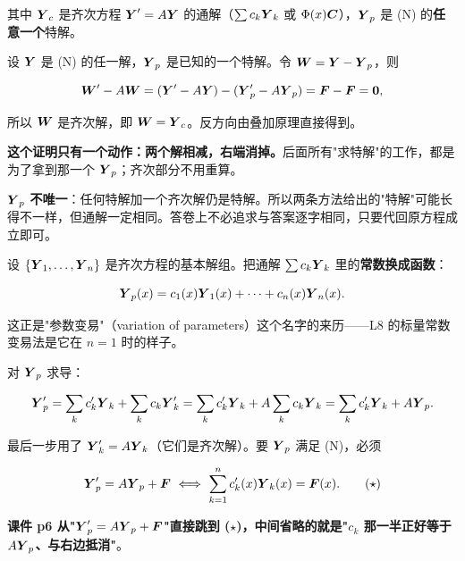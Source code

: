 \documentclass[11pt]{ctexart}
\begin{document}
其中 $\boldsymbol{Y}_c$ 是齐次方程 $\boldsymbol{Y}'=A\boldsymbol{Y}$ 的通解（$\sum c_k\boldsymbol{Y}_k$ 或 $\Phi(x)\boldsymbol{C}$），$\boldsymbol{Y}_p$ 是 (N) 的\textbf{任意一个}特解。


设 $\boldsymbol{Y}$ 是 (N) 的任一解，$\boldsymbol{Y}_p$ 是已知的一个特解。令 $\boldsymbol{W}=\boldsymbol{Y}-\boldsymbol{Y}_p$，则

\[
\boldsymbol{W}'-A\boldsymbol{W}=(\boldsymbol{Y}'-A\boldsymbol{Y})-(\boldsymbol{Y}_p'-A\boldsymbol{Y}_p)=\boldsymbol{F}-\boldsymbol{F}=\boldsymbol{0},
\]

所以 $\boldsymbol{W}$ 是齐次解，即 $\boldsymbol{W}=\boldsymbol{Y}_c$。反方向由叠加原理直接得到。

\textbf{这个证明只有一个动作：两个解相减，右端消掉。}后面所有"求特解"的工作，都是为了拿到那一个 $\boldsymbol{Y}_p$；齐次部分不用重算。


$\boldsymbol{Y}_p$ \textbf{不唯一}：任何特解加一个齐次解仍是特解。所以两条方法给出的"特解"可能长得不一样，但通解一定相同。答卷上不必追求与答案逐字相同，只要代回原方程成立即可。



设 $\{\boldsymbol{Y}_1,\dots,\boldsymbol{Y}_n\}$ 是齐次方程的基本解组。把通解 $\sum c_k\boldsymbol{Y}_k$ 里的\textbf{常数换成函数}：

\[
\boldsymbol{Y}_p(x)=c_1(x)\boldsymbol{Y}_1(x)+\cdots+c_n(x)\boldsymbol{Y}_n(x).
\]

这正是"参数变易"（variation of parameters）这个名字的来历——L8 的标量常数变易法是它在 $n=1$ 时的样子。


对 $\boldsymbol{Y}_p$ 求导：

\[
\boldsymbol{Y}_p'=\sum_k c_k'\boldsymbol{Y}_k+\sum_k c_k\boldsymbol{Y}_k'
=\sum_k c_k'\boldsymbol{Y}_k+A\sum_k c_k\boldsymbol{Y}_k
=\sum_k c_k'\boldsymbol{Y}_k+A\boldsymbol{Y}_p .
\]

最后一步用了 $\boldsymbol{Y}_k'=A\boldsymbol{Y}_k$（它们是齐次解）。要 $\boldsymbol{Y}_p$ 满足 (N)，必须

\[
\boldsymbol{Y}_p'=A\boldsymbol{Y}_p+\boldsymbol{F}
\ \Longleftrightarrow\
\sum_{k=1}^{n}c_k'(x)\boldsymbol{Y}_k(x)=\boldsymbol{F}(x).\tag{$\star$}
\]

\textbf{课件 p6 从"$\boldsymbol{Y}_p'=A\boldsymbol{Y}_p+\boldsymbol{F}$"直接跳到 ($\star$)，中间省略的就是"$c_k$ 那一半正好等于 $A\boldsymbol{Y}_p$、与右边抵消"}。

\end{document}
